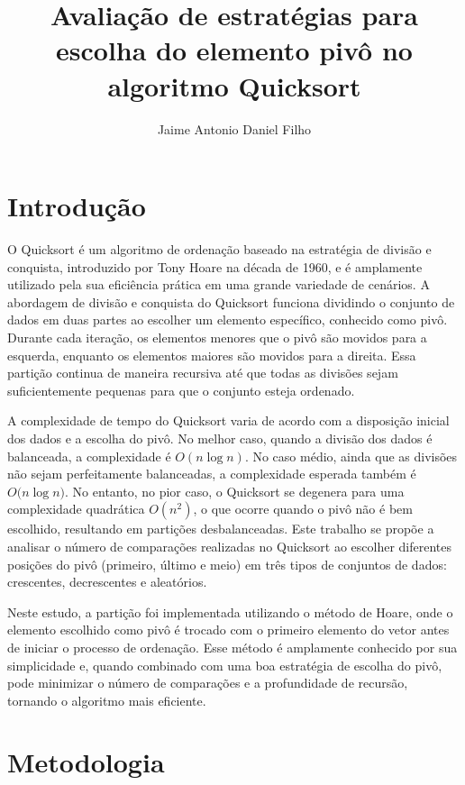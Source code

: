 \documentclass[12pt]{article}
\title{Avaliação de estratégias para escolha do elemento pivô no algoritmo Quicksort}
\author{Jaime Antonio Daniel Filho\inst{1}}
\begin{document}
 

\maketitle

\section{Introdução}

O Quicksort é um algoritmo de ordenação baseado na estratégia de divisão e conquista, introduzido por Tony Hoare na década de 1960, e é amplamente utilizado pela sua eficiência prática em uma grande variedade de cenários. A abordagem de divisão e conquista do Quicksort funciona dividindo o conjunto de dados em duas partes ao escolher um elemento específico, conhecido como pivô. Durante cada iteração, os elementos menores que o pivô são movidos para a esquerda, enquanto os elementos maiores são movidos para a direita. Essa partição continua de maneira recursiva até que todas as divisões sejam suficientemente pequenas para que o conjunto esteja ordenado.

A complexidade de tempo do Quicksort varia de acordo com a disposição inicial dos dados e a escolha do pivô. No melhor caso, quando a divisão dos dados é balanceada, a complexidade é $O(n \log{n})$. No caso médio, ainda que as divisões não sejam perfeitamente balanceadas, a complexidade esperada também é $O(n \log{n)}$. No entanto, no pior caso, o Quicksort se degenera para uma complexidade quadrática $O(n^2)$, o que ocorre quando o pivô não é bem escolhido, resultando em partições desbalanceadas. Este trabalho se propõe a analisar o número de comparações realizadas no Quicksort ao escolher diferentes posições do pivô (primeiro, último e meio) em três tipos de conjuntos de dados: crescentes, decrescentes e aleatórios.

Neste estudo, a partição foi implementada utilizando o método de Hoare, onde o elemento escolhido como pivô é trocado com o primeiro elemento do vetor antes de iniciar o processo de ordenação. Esse método é amplamente conhecido por sua simplicidade e, quando combinado com uma boa estratégia de escolha do pivô, pode minimizar o número de comparações e a profundidade de recursão, tornando o algoritmo mais eficiente.

\section{Metodologia}
\end{document}
